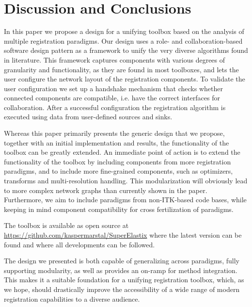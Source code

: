 \section{Discussion and Conclusions}
\label{sec:discussion}
\label{sec:conclusion}
In this paper we propose a design for a unifying toolbox based on the analysis of multiple registration paradigms.
Our design uses a role- and collaboration-based software design pattern as a framework to unify the very diverse algorithms found in literature.
This framework captures components with various degrees of granularity and functionality, as they are found in most toolboxes, and lets the user configure the network layout of the registration components.
To validate the user configuration we set up a handshake mechanism that checks whether connected components are compatible, i.e. have the correct interfaces for collaboration. After a successful configuration the registration algorithm is executed using data from user-defined sources and sinks.

Whereas this paper primarily presents the generic design that we propose, together with an initial implementation and results, the functionality of the toolbox can be greatly extended.
An immediate point of action is to extend the
functionality of the toolbox by including components from more registration paradigms, and to include more fine-grained components, such as optimizers, transforms and multi-resolution handling.
This modularization will obviously lead to more complex network graphs than currently shown in the paper.
Furthermore, we aim to include paradigms from non-ITK-based code bases, while keeping in mind component compatibility for cross fertilization of paradigms.

The toolbox is available as open source at 
\url{https://github.com/kaspermarstal/SuperElastix}
where the latest version can be found and where all developments can be followed.

The design we presented is both capable of generalizing across paradigms, fully supporting modularity, as well as provides an on-ramp for method integration.
This makes it a suitable foundation for a unifying registration toolbox, which, as we hope, should drastically improve the accessibility of a wide range of modern registration capabilities to a diverse audience.
